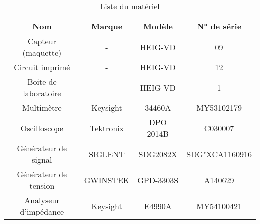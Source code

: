 \begin{table}[H]
    \centering
    \begin{tabular}{|c|c|c|c|}
    \hline
    \textbf{Nom}          & \textbf{Marque} & \textbf{Modèle} & \textbf{N° de série} \\ \hline
    Capteur (maquette)    & -               & HEIG-VD         & 09                   \\ \hline
    Circuit imprimé       & -               & HEIG-VD         & 12                   \\ \hline
    Boite de laboratoire  & -               & HEIG-VD         & 1                    \\ \hline
    Multimètre            & Keysight        & 34460A          & MY53102179           \\ \hline
    Oscilloscope          & Tektronix       & DPO 2014B       & C030007              \\ \hline
    Générateur de signal  & SIGLENT         & SDG2082X        & SDG"XCA1160916       \\ \hline
    Générateur de tension & GWINSTEK        & GPD-3303S       & A140629              \\ \hline
    Analyseur d'impédance & Keysight        & E4990A          & MY54100421           \\ \hline
    \end{tabular}
    \caption{Liste du matériel}
    \end{table}





    

